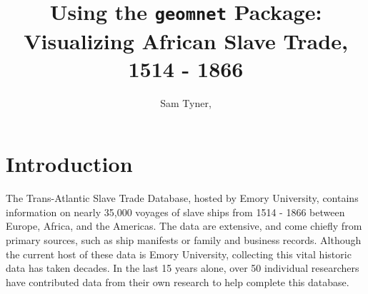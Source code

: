 \documentclass[DIV=calc, paper=a4, fontsize=10pt, twocolumn]{scrartcl}\usepackage[]{graphicx}\usepackage[]{color}
\title{Using the \texttt{geomnet} Package: Visualizing African Slave Trade, 1514 - 1866} %
\author{Sam Tyner, } %
\date{} %
\newcommand{\initial}[1]{ %
\lettrine[lines=3,lhang=0.3,nindent=0em]{
\color{black}
{\textsf{#1}}}{}}
\newcommand{\st}[1]{{\color{purple} #1}}
\begin{document}
\maketitle %

\thispagestyle{fancy} %


\vspace{-1cm}

\section*{Introduction}

\par The Trans-Atlantic Slave Trade Database, hosted by Emory University, contains information on nearly 35,000 voyages of slave ships from 1514 - 1866 between Europe, Africa, and the Americas.%
The data are extensive, and come chiefly from primary sources, such as ship manifests or family and business records. Although the current host of these data is Emory University, collecting this vital historic data has taken decades. In the last 15 years alone, over 50 individual researchers have contributed data from their own research to help complete this database. 
\end{document}

